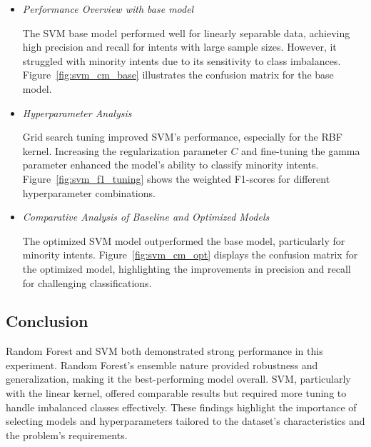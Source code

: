             \begin{itemize}
        
                \item \textit{Performance Overview with base model}
                
                    \vspace{0.3em}

                    The SVM base model performed well for linearly separable data, achieving high precision and recall for intents with large sample sizes. However, it struggled with minority intents due to its sensitivity to class imbalances. Figure~\ref{fig:svm_cm_base} illustrates the confusion matrix for the base model.

                \vspace{0.5em}

                \item \textit{Hyperparameter Analysis}
                
                    \vspace{0.3em}

                    Grid search tuning improved SVM's performance, especially for the RBF kernel. Increasing the regularization parameter \( C \) and fine-tuning the gamma parameter enhanced the model's ability to classify minority intents. Figure~\ref{fig:svm_f1_tuning} shows the weighted F1-scores for different hyperparameter combinations.

                \vspace{0.5em}

                \item \textit{Comparative Analysis of Baseline and Optimized Models}
                
                    \vspace{0.3em}

                    The optimized SVM model outperformed the base model, particularly for minority intents. Figure~\ref{fig:svm_cm_opt} displays the confusion matrix for the optimized model, highlighting the improvements in precision and recall for challenging classifications.

            \end{itemize}

    \subsection{Conclusion}
    
        Random Forest and SVM both demonstrated strong performance in this experiment. Random Forest's ensemble nature provided robustness and generalization, making it the best-performing model overall. SVM, particularly with the linear kernel, offered comparable results but required more tuning to handle imbalanced classes effectively. These findings highlight the importance of selecting models and hyperparameters tailored to the dataset's characteristics and the problem's requirements.

